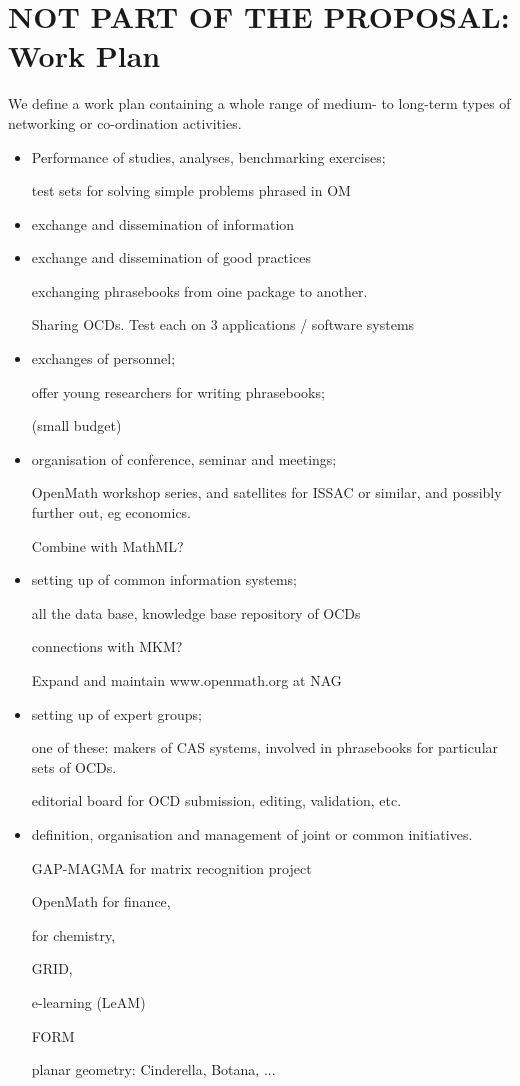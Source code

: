 \documentclass[draft]{artikel3}
\begin{document}
\newpage

\section{NOT PART OF THE PROPOSAL: Work Plan}
We define a work plan containing a whole range of medium- to long-term
types of networking or co-ordination activities.
\begin{itemize}
\item Performance of studies, analyses, benchmarking exercises;

test sets for  solving simple problems phrased in OM


\item exchange and dissemination of information

\item exchange and dissemination of good practices

exchanging phrasebooks from oine package to another.

Sharing OCDs.
Test each on 3 applications / software systems

\item exchanges of personnel;

offer young researchers for writing phrasebooks;

(small  budget)


\item organisation of conference, seminar and meetings;

OpenMath workshop series, and satellites for ISSAC or similar, and
possibly further out, eg economics.

Combine with MathML?

\item setting up of common information systems;

all the data base, knowledge base repository of OCDs

connections with MKM?

Expand and maintain www.openmath.org at NAG


\item setting up of expert groups;

one of these: makers of CAS systems, involved in phrasebooks for
particular sets of OCDs.

editorial board for OCD submission, editing, validation, etc.

\item definition, organisation and management of joint or common
  initiatives.

GAP-MAGMA for matrix recognition project

OpenMath for finance,

for chemistry,

GRID,

e-learning (LeAM)

FORM

planar geometry: Cinderella, Botana, ...



\end{itemize}
\end{document}
